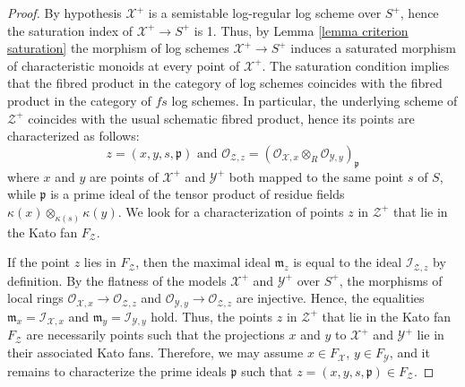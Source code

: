 \documentclass{amsart}%
\numberwithin{equation}{subsection}
\theoremstyle{plain2}
\theoremstyle{definition2}
\theoremstyle{stepstyle}
\theoremstyle{point}
\theoremstyle{subpoint}
\newcommand{\cX}{\ensuremath{\mathscr{X}}}
\newcommand{\fp}{\ensuremath{\mathfrak{p}}}
\newcommand{\caO}{\ensuremath{\mathcal{O}}}
\newcommand{\caI}{\ensuremath{\mathcal{I}}}
\newcommand{\cY}{\ensuremath{\mathscr{Y}}}
\newcommand{\cZ}{\ensuremath{\mathscr{Z}}}
\renewcommand{\cZ}{\ensuremath{\mathscr{Z}}}
\renewcommand{\cY}{\ensuremath{\mathscr{Y}}}
\begin{document}
\begin{proof}
By hypothesis $\cX^+$ is a semistable log-regular log scheme over $S^+$, hence the saturation index of $\cX^+ \rightarrow S^+$ is 1. Thus, by Lemma \ref{lemma criterion saturation} the morphism of log schemes $\cX^+ \rightarrow S^+$ induces a saturated morphism of characteristic monoids at every point of $\cX^+$. The saturation condition implies that the fibred product in the category of log schemes coincides with the fibred product in the category of $fs$ log schemes. In particular, the underlying scheme of $\cZ^+$ coincides with the usual schematic fibred product, hence its points are characterized as follows:$$z=(x,y,s,\fp) \text{ and } \caO_{\cZ,z}=(\caO_{\cX,x} \otimes_R \caO_{\cY,y})_{\fp}$$ where $x$ and $y$ are points of $\cX^+$ and $\cY^+$ both mapped to the same point $s$ of $S$, while $\fp$ is a prime ideal of the tensor product of residue fields $\kappa(x) \otimes_{\kappa(s)} \kappa(y)$. We look for a characterization of points $z$ in $\cZ^+$ that lie in the Kato fan $F_{\cZ}$.

If the point $z$ lies in $F_{\cZ}$, then the maximal ideal $\mathfrak{m}_z$ is equal to the ideal $\caI_{\cZ,z}$ by definition. By the flatness of the models $\cX^+$ and $\cY^+$ over $S^+$, the morphisms of local rings $\caO_{\cX,x} \rightarrow \caO_{\cZ,z}$ and $\caO_{\cY,y} \rightarrow \caO_{\cZ,z}$ are injective. Hence, the equalities $\mathfrak{m}_x= \caI_{\cX,x}$ and $\mathfrak{m}_y= \caI_{\cY,y}$ hold. Thus, the points $z$ in $\cZ^+$ that lie in the Kato fan $F_{\cZ}$ are necessarily points such that the projections $x$ and $y$ to $\cX^+$ and $\cY^+$ lie in their associated Kato fans. Therefore, we may assume $x \in F_{\cX}$, $y \in F_{\cY}$, and it remains to characterize the prime ideals $\fp$ such that $z=(x,y,s,\fp) \in F_{\cZ}$.


\end{proof}
\end{document}
